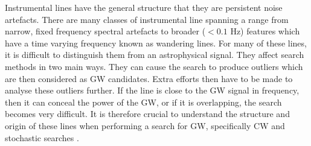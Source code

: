 %

Instrumental lines have the general structure that they are persistent noise artefacts.
There are many classes of instrumental line spanning a range from narrow, fixed frequency spectral artefacts to broader ($<0.1$ Hz) features which have a time varying frequency known as wandering lines.
For many of these lines, it is difficult to distinguish them from an astrophysical signal.
They affect search methods in two main ways. 
They can cause the search to produce outliers which are then considered as \gls{GW} candidates.
Extra efforts then have to be made to analyse these outliers further.
If the line is close to the \gls{GW} signal in frequency, then it can conceal the power of the \gls{GW}, or if it is overlapping, the search becomes very difficult.
It is therefore crucial to understand the structure and origin of these lines when performing a search for \gls{GW}, specifically \gls{CW} and stochastic searches .

%

